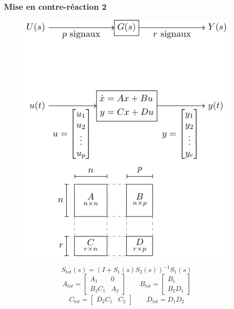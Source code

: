 \documentclass[resume]{subfiles}
\begin{document}
\subsubsection{Mise en contre-réaction 2}
\begin{figure}[H]
\centering
\includegraphics[scale=1,page=5]{drwg_0.pdf}
\end{figure}
$$S_{tot}(s)=\left(I+S_1(s)S_2(s)\right)^{-1}S_1(s)$$
$$A_{tot}=\begin{bmatrix}A_1 & 0\\B_2C_1 & A_2\end{bmatrix}\qquad B_{tot}=\begin{bmatrix}B_1\\B_2D_1\end{bmatrix}$$
$$C_{tot}=\begin{bmatrix}
D_2 C_1 & C_2
\end{bmatrix}\qquad D_{tot}=D_1D_2$$
\end{document}

